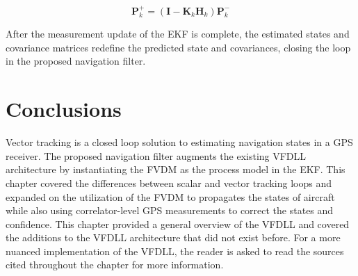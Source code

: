 \begin{equation}\label{eq:pplus}
    \mathbf{P}^+_k = \left(\mathbf{I} - \mathbf{K}_k\mathbf{H}_k\right)\mathbf{P}^-_k
\end{equation}

After the measurement update of the EKF is complete, the estimated states and covariance matrices redefine the predicted state and covariances, closing the loop in the proposed navigation filter.

\section{Conclusions}
Vector tracking is a closed loop solution to estimating navigation states in a GPS receiver. The proposed navigation filter augments the existing VFDLL architecture by instantiating the FVDM as the process model in the EKF\@. This chapter covered the differences between scalar and vector tracking loops and expanded on the utilization of the FVDM to propagates the states of aircraft while also using correlator-level GPS measurements to correct the states and confidence. This chapter provided a general overview of the VFDLL and covered the additions to the VFDLL architecture that did not exist before. For a more nuanced implementation of the VFDLL, the reader is asked to read the sources cited throughout the chapter for more information.